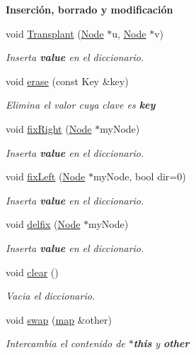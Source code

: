 \begin{Indent}{\bf Inserción, borrado y modificación}
\begin{DoxyCompactItemize}
void \hyperlink{classaed2_1_1map_a6c9fb4a85c0e8d2de5dcbdbc0d695be5_a6c9fb4a85c0e8d2de5dcbdbc0d695be5}{Transplant} (\hyperlink{structaed2_1_1map_1_1Node}{Node} $\ast$u, \hyperlink{structaed2_1_1map_1_1Node}{Node} $\ast$v)
\begin{DoxyCompactList}\small\item\em Inserta {\bfseries value} en el diccionario. \end{DoxyCompactList}\item 
void \hyperlink{classaed2_1_1map_a2ffadb42cd5f0bc7b3752ff159b75334_a2ffadb42cd5f0bc7b3752ff159b75334}{erase} (const Key \&key)
\begin{DoxyCompactList}\small\item\em Elimina el valor cuya clave es {\bfseries key} \end{DoxyCompactList}\item 
void \hyperlink{classaed2_1_1map_ae908761d06411046290cf49a5e0618bd_ae908761d06411046290cf49a5e0618bd}{fix\+Right} (\hyperlink{structaed2_1_1map_1_1Node}{Node} $\ast$my\+Node)
\begin{DoxyCompactList}\small\item\em Inserta {\bfseries value} en el diccionario. \end{DoxyCompactList}\item 
void \hyperlink{classaed2_1_1map_ae69c26a9d27f538124cd827646e56feb_ae69c26a9d27f538124cd827646e56feb}{fix\+Left} (\hyperlink{structaed2_1_1map_1_1Node}{Node} $\ast$my\+Node, bool dir=0)
\begin{DoxyCompactList}\small\item\em Inserta {\bfseries value} en el diccionario. \end{DoxyCompactList}\item 
void \hyperlink{classaed2_1_1map_a056322ff63d37b43d042ffa0378c9fd2_a056322ff63d37b43d042ffa0378c9fd2}{delfix} (\hyperlink{structaed2_1_1map_1_1Node}{Node} $\ast$my\+Node)
\begin{DoxyCompactList}\small\item\em Inserta {\bfseries value} en el diccionario. \end{DoxyCompactList}\item 
void \hyperlink{classaed2_1_1map_a2bfa5165825979bf2431db55bc6bc9ca_a2bfa5165825979bf2431db55bc6bc9ca}{clear} ()
\begin{DoxyCompactList}\small\item\em Vacia el diccionario. \end{DoxyCompactList}\item 
void \hyperlink{classaed2_1_1map_a43ddb71cc91e5c6021a7a1f243d6cc4a_a43ddb71cc91e5c6021a7a1f243d6cc4a}{swap} (\hyperlink{classaed2_1_1map}{map} \&other)
\begin{DoxyCompactList}\small\item\em Intercambia el contenido de {\bfseries $\ast$this} y {\bfseries other} \end{DoxyCompactList}\end{DoxyCompactItemize}
\end{Indent}
